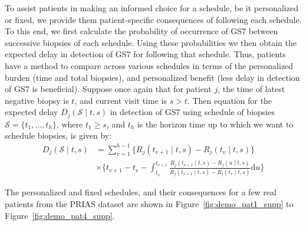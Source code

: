 To assist patients in making an informed choice for a schedule, be it personalized or fixed, we provide them patient-specific consequences of following each schedule. To this end, we first calculate the probability of occurrence of GS7 between successive biopsies of each schedule. Using these probabilities we then obtain the expected delay in detection of GS7 for following that schedule. Thus, patients have a method to compare across various schedules in terms of the personalized burden (time and total biopsies), and personalized benefit (less delay in detection of GS7 is beneficial). Suppose once again that for patient $j$, the time of latest negative biopsy is $t$, and current visit time is $s > t$. Then equation for the expected delay $D_j(\mathcal{S} \mid t,s)$ in detection of GS7 using schedule of biopsies $\mathcal{S} = \{t_1, \ldots, t_h\}$, where $t_1 \geq s$, and $t_h$ is the horizon time up to which we want to schedule biopsies, is given by:
\begin{equation}
\label{eq:expected_delay}
\begin{split}
D_j(\mathcal{S} \mid t,s) &= \sum_{v=1}^{h-1} \Big\{R_j(t_{v+1}\mid t,s) - R_j(t_v\mid t,s)\Big\} \\ & \times  \Bigg\{t_{v+1} - t_{v} - \int_{t_v}^{t_{v+1}} \frac{R_j(t_{v+1}\mid t,s)-R_j(u \mid t,s)}{R_j(t_{v+1}\mid t,s) - R_j(t_v\mid t,s)} \mathrm{d}u \Bigg\}
\end{split}
\end{equation}
 
The personalized and fixed schedules, and their consequences for a few real patients from the PRIAS dataset are shown in Figure~\ref{fig:demo_pat1_supp} to Figure~\ref{fig:demo_pat4_supp}. 

